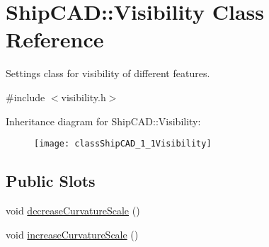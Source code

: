\hypertarget{classShipCAD_1_1Visibility}{}\section{Ship\+C\+AD\+:\+:Visibility Class Reference}
\label{classShipCAD_1_1Visibility}


Settings class for visibility of different features.  




{\ttfamily \#include $<$visibility.\+h$>$}

Inheritance diagram for Ship\+C\+AD\+:\+:Visibility\+:\begin{figure}[H]
\begin{center}
\leavevmode
\texttt{[image: classShipCAD\_1\_1Visibility]}
\end{center}
\end{figure}
\subsection*{Public Slots}
\begin{DoxyCompactItemize}
\item 
void \hyperlink{classShipCAD_1_1Visibility_aa9ff89a0d825c2e5ac3fe9c08da9daec}{decrease\+Curvature\+Scale} ()
\item 
void \hyperlink{classShipCAD_1_1Visibility_af8ff6d1f77f64179f186a200ef7d056c}{increase\+Curvature\+Scale} ()
\end{DoxyCompactItemize}
